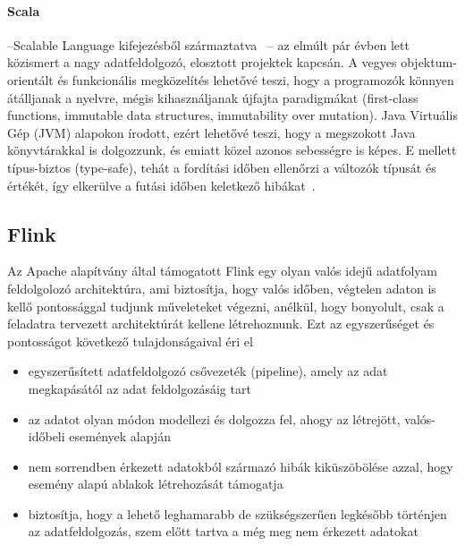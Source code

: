 \documentclass[a4paper,12pt]{article}
\begin{document}
\paragraph{Scala}--Scalable Language kifejezésből származtatva ~\cite{odersky}-- az elmúlt pár évben lett közismert a nagy adatfeldolgozó, elosztott projektek kapcsán. A vegyes objektum-orientált és funkcionális megközelítés lehetővé teszi, hogy a programozók könnyen átálljanak a nyelvre, mégis kihasználjanak újfajta paradigmákat (first-class functions, immutable data structures, immutability over mutation). Java Virtuális Gép (JVM) alapokon írodott, ezért lehetővé teszi, hogy a megszokott Java könyvtárakkal is dolgozzunk, és emiatt közel azonos sebességre is képes.  E mellett típus-biztos (type-safe), tehát a fordítási időben ellenőrzi a változók típusát és értékét, így elkerülve a futási időben keletkező hibákat~\cite{toptal}. 

\subsection{Flink}
Az Apache alapítvány által támogatott Flink egy olyan valós idejű adatfolyam feldolgolozó architektúra, ami biztosítja, hogy valós időben, végtelen adaton is kellő pontossággal tudjunk műveleteket végezni, anélkül, hogy bonyolult, csak a feladatra tervezett architektúrát kellene létrehoznunk. Ezt az egyszerűséget és pontosságot következő tulajdonságaival éri el ~\cite{flink}
\begin{itemize}
\item egyszerűsített adatfeldolgozó csővezeték (pipeline), amely az adat megkapásától az adat feldolgozásáig tart
\item az adatot olyan módon modellezi és dolgozza fel, ahogy az létrejött, valós-időbeli események alapján
\item nem sorrendben érkezett adatokból származó hibák kiküszöbölése azzal, hogy esemény alapú ablakok létrehozását támogatja
\item biztosítja, hogy a lehető leghamarabb de szükségszerűen legkésőbb történjen az adatfeldolgozás, szem előtt tartva a még meg nem érkezett adatokat
\end{itemize}

\printbibliography

\end{document}
